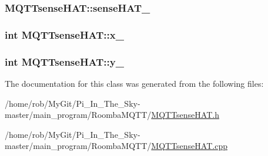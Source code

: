\subsubsection[{\texorpdfstring{sense\+H\+A\+T\+\_\+}{senseHAT_}}]{ M\+Q\+T\+Tsense\+H\+A\+T\+::sense\+H\+A\+T\+\_\+}\hypertarget{class_m_q_t_tsense_h_a_t_a50dfd49dde7594da4193b8b90f6c1048}{}\label{class_m_q_t_tsense_h_a_t_a50dfd49dde7594da4193b8b90f6c1048}
\subsubsection[{\texorpdfstring{x\+\_\+}{x_}}]{\setlength{\rightskip}{0pt plus 5cm}int M\+Q\+T\+Tsense\+H\+A\+T\+::x\+\_\+\hspace{0.3cm}{\ttfamily [protected]}}\hypertarget{class_m_q_t_tsense_h_a_t_a767f72e68bff1bf52e07b66f44ac40c8}{}\label{class_m_q_t_tsense_h_a_t_a767f72e68bff1bf52e07b66f44ac40c8}
\subsubsection[{\texorpdfstring{y\+\_\+}{y_}}]{\setlength{\rightskip}{0pt plus 5cm}int M\+Q\+T\+Tsense\+H\+A\+T\+::y\+\_\+\hspace{0.3cm}{\ttfamily [protected]}}\hypertarget{class_m_q_t_tsense_h_a_t_a608b724d2ab92ed1ea3b3c4c1066961d}{}\label{class_m_q_t_tsense_h_a_t_a608b724d2ab92ed1ea3b3c4c1066961d}


The documentation for this class was generated from the following files\+:\begin{DoxyCompactItemize}
\item 
/home/rob/\+My\+Git/\+Pi\+\_\+\+In\+\_\+\+The\+\_\+\+Sky-\/master/main\+\_\+program/\+Roomba\+M\+Q\+T\+T/\hyperlink{_m_q_t_tsense_h_a_t_8h}{M\+Q\+T\+Tsense\+H\+A\+T.\+h}\item 
/home/rob/\+My\+Git/\+Pi\+\_\+\+In\+\_\+\+The\+\_\+\+Sky-\/master/main\+\_\+program/\+Roomba\+M\+Q\+T\+T/\hyperlink{_m_q_t_tsense_h_a_t_8cpp}{M\+Q\+T\+Tsense\+H\+A\+T.\+cpp}\end{DoxyCompactItemize}
